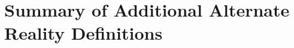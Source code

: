 


\section{Summary of Additional Alternate Reality Definitions}
\label{summaryofadditionalalternaterealitydefinitions}

